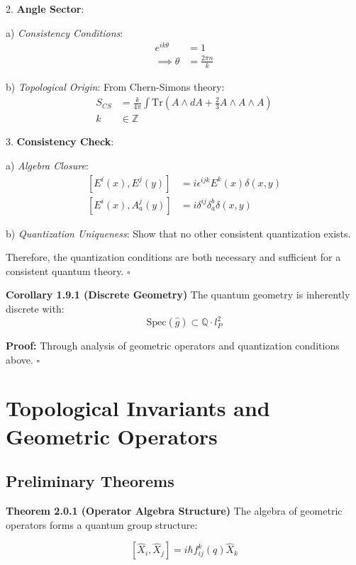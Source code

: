 \documentclass[12pt,a4paper]{article}
\begin{document}
2. \textbf{Angle Sector}:
   
   a) \textit{Consistency Conditions}:
      \[
      \begin{aligned}
      e^{ik\theta} &= 1 \\
      \implies \theta &= \frac{2\pi n}{k}
      \end{aligned}
      \]
   
   b) \textit{Topological Origin}:
      From Chern-Simons theory:
      \[
      \begin{aligned}
      S_{CS} &= \frac{k}{4\pi}\int \text{Tr}(A\wedge dA + \frac{2}{3}A\wedge A\wedge A) \\
      k &\in \mathbb{Z}
      \end{aligned}
      \]

3. \textbf{Consistency Check}:
   
   a) \textit{Algebra Closure}:
      \[
      \begin{aligned}
      [E^i(x), E^j(y)] &= i\epsilon^{ijk}E^k(x)\delta(x,y) \\
      [E^i(x), A_a^j(y)] &= i\delta^{ij}\delta_a^b\delta(x,y)
      \end{aligned}
      \]
   
   b) \textit{Quantization Uniqueness}:
      Show that no other consistent quantization exists.

Therefore, the quantization conditions are both necessary and sufficient for a consistent quantum theory. $\square$

\textbf{Corollary 1.9.1 (Discrete Geometry)}
The quantum geometry is inherently discrete with:
\[
\text{Spec}(\hat{g}) \subset \mathbb{Q}\cdot l_P^2
\]

\textbf{Proof:}
Through analysis of geometric operators and quantization conditions above. $\square$

\section{Topological Invariants and Geometric Operators}
\subsection{Preliminary Theorems}

\textbf{Theorem 2.0.1 (Operator Algebra Structure)}
The algebra of geometric operators forms a quantum group structure:

\[
[\hat{X}_i, \hat{X}_j] = i\hbar f_{ij}^k(q)\hat{X}_k
\]
\end{document}
